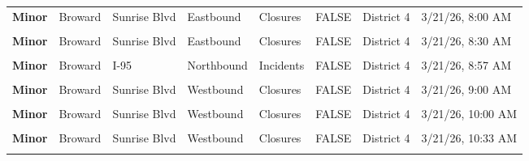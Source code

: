 \documentclass[
]{article}
\begin{document}
\begin{longtable}[t]{>{\raggedright\arraybackslash}p{1.5cm}>{\raggedright\arraybackslash}p{2.5cm}>{\raggedright\arraybackslash}p{3cm}>{\raggedright\arraybackslash}p{1.8cm}>{\raggedright\arraybackslash}p{2.5cm}lll}
\textbf{Minor} & Broward & Sunrise Blvd & Eastbound & Closures & FALSE & District 4 & 3/21/26, 8:00 AM\\
\textbf{\cellcolor{gray!10}{Minor}} & \cellcolor{gray!10}{Broward} & \cellcolor{gray!10}{Sunrise Blvd} & \cellcolor{gray!10}{Westbound} & \cellcolor{gray!10}{Closures} & \cellcolor{gray!10}{FALSE} & \cellcolor{gray!10}{District 4} & \cellcolor{gray!10}{3/21/26, 8:00 AM}\\
\textbf{Minor} & Broward & Sunrise Blvd & Eastbound & Closures & FALSE & District 4 & 3/21/26, 8:30 AM\\
\addlinespace
\textbf{\cellcolor{gray!10}{Minor}} & \cellcolor{gray!10}{Broward} & \cellcolor{gray!10}{Sunrise Blvd} & \cellcolor{gray!10}{Westbound} & \cellcolor{gray!10}{Closures} & \cellcolor{gray!10}{FALSE} & \cellcolor{gray!10}{District 4} & \cellcolor{gray!10}{3/21/26, 8:30 AM}\\
\textbf{Minor} & Broward & I-95 & Northbound & Incidents & FALSE & District 4 & 3/21/26, 8:57 AM\\
\textbf{\cellcolor{gray!10}{Minor}} & \cellcolor{gray!10}{Broward} & \cellcolor{gray!10}{Sunrise Blvd} & \cellcolor{gray!10}{Eastbound} & \cellcolor{gray!10}{Closures} & \cellcolor{gray!10}{FALSE} & \cellcolor{gray!10}{District 4} & \cellcolor{gray!10}{3/21/26, 9:00 AM}\\
\textbf{Minor} & Broward & Sunrise Blvd & Westbound & Closures & FALSE & District 4 & 3/21/26, 9:00 AM\\
\textbf{\cellcolor{gray!10}{Minor}} & \cellcolor{gray!10}{Broward} & \cellcolor{gray!10}{Sunrise Blvd} & \cellcolor{gray!10}{Eastbound} & \cellcolor{gray!10}{Closures} & \cellcolor{gray!10}{FALSE} & \cellcolor{gray!10}{District 4} & \cellcolor{gray!10}{3/21/26, 10:00 AM}\\
\addlinespace
\textbf{Minor} & Broward & Sunrise Blvd & Westbound & Closures & FALSE & District 4 & 3/21/26, 10:00 AM\\
\textbf{\cellcolor{gray!10}{Minor}} & \cellcolor{gray!10}{Broward} & \cellcolor{gray!10}{Sunrise Blvd} & \cellcolor{gray!10}{Eastbound} & \cellcolor{gray!10}{Closures} & \cellcolor{gray!10}{FALSE} & \cellcolor{gray!10}{District 4} & \cellcolor{gray!10}{3/21/26, 10:33 AM}\\
\textbf{Minor} & Broward & Sunrise Blvd & Westbound & Closures & FALSE & District 4 & 3/21/26, 10:33 AM\\
\textbf{\cellcolor{gray!10}{Minor}} & \cellcolor{gray!10}{Broward} & \cellcolor{gray!10}{Sunrise Blvd} & \cellcolor{gray!10}{Eastbound} & \cellcolor{gray!10}{Closures} & \cellcolor{gray!10}{FALSE} & \cellcolor{gray!10}{District 4} & \cellcolor{gray!10}{3/21/26, 11:00 AM}\\

\end{longtable}
\end{document}
